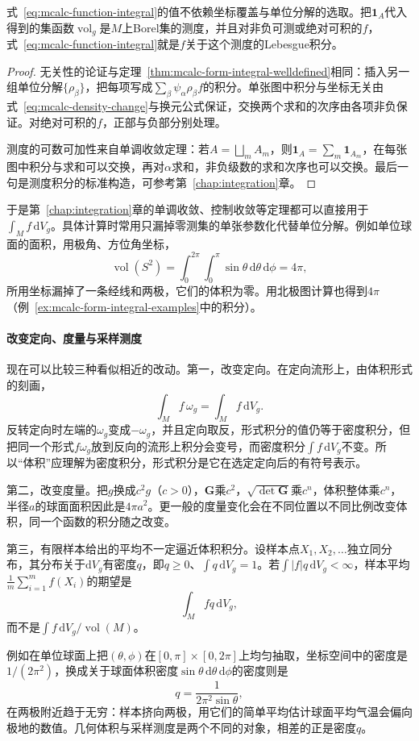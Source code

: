 \begin{theorem}[函数积分的良定性]
\label{thm:mcalc-function-integral-welldefined}
式~\eqref{eq:mcalc-function-integral}的值不依赖坐标覆盖与单位分解的选取。把$\mathbf 1_A$代入得到的集函数$\operatorname{vol}_g$是$M$上Borel集的测度，并且对非负可测或绝对可积的$f$，式~\eqref{eq:mcalc-function-integral}就是$f$关于这个测度的Lebesgue积分。
\end{theorem}

\begin{proof}
无关性的论证与定理~\ref{thm:mcalc-form-integral-welldefined}相同：插入另一组单位分解$\{\rho_\beta\}$，把每项写成$\sum_\beta\psi_\alpha\rho_\beta f$的积分。单张图中积分与坐标无关由式~\eqref{eq:mcalc-density-change}与换元公式保证，交换两个求和的次序由各项非负保证。对绝对可积的$f$，正部与负部分别处理。

测度的可数可加性来自单调收敛定理：若$A=\bigsqcup_mA_m$，则$\mathbf 1_A=\sum_m\mathbf 1_{A_m}$，在每张图中积分与求和可以交换，再对$\alpha$求和，非负级数的求和次序也可以交换。最后一句是测度积分的标准构造，可参考第~\ref{chap:integration}章。
\end{proof}

于是第~\ref{chap:integration}章的单调收敛、控制收敛等定理都可以直接用于$\int_Mf\,\mathrm dV_g$。具体计算时常用只漏掉零测集的单张参数化代替单位分解。例如单位球面的面积，用极角、方位角坐标，
\[
\operatorname{vol}(S^2)=\int_0^{2\pi}\!\!\int_0^\pi\sin\theta\,\mathrm d\theta\,\mathrm d\phi=4\pi ,
\]
所用坐标漏掉了一条经线和两极，它们的体积为零。用北极图计算也得到$4\pi$（例~\ref{ex:mcalc-form-integral-examples}中的积分）。

\paragraph{改变定向、度量与采样测度}
现在可以比较三种看似相近的改动。第一，改变定向。在定向流形上，由体积形式的刻画，
\[
\int_Mf\,\omega_g=\int_Mf\,\mathrm dV_g .
\]
反转定向时左端的$\omega_g$变成$-\omega_g$，并且定向取反，形式积分的值仍等于密度积分，但把同一个形式$f\omega_g$放到反向的流形上积分会变号，而密度积分$\int f\,\mathrm dV_g$不变。所以“体积”应理解为密度积分，形式积分是它在选定定向后的有符号表示。

第二，改变度量。把$g$换成$c^2g$（$c>0$），$\bm G$乘$c^2$，$\sqrt{\det\bm G}$乘$c^n$，体积整体乘$c^n$，半径$a$的球面面积因此是$4\pi a^2$。更一般的度量变化会在不同位置以不同比例改变体积，同一个函数的积分随之改变。

第三，有限样本给出的平均不一定逼近体积积分。设样本点$X_1,X_2,\ldots$独立同分布，其分布关于$\mathrm dV_g$有密度$q$，即$q\geq0$、$\int q\,\mathrm dV_g=1$。若$\int\lvert f\rvert q\,\mathrm dV_g<\infty$，样本平均$\frac1m\sum_{i=1}^mf(X_i)$的期望是
\[
\int_Mfq\,\mathrm dV_g ,
\]
而不是$\int f\,\mathrm dV_g/\operatorname{vol}(M)$。

例如在单位球面上把$(\theta,\phi)$在$[0,\pi]\times[0,2\pi]$上均匀抽取，坐标空间中的密度是$1/(2\pi^2)$，换成关于球面体积密度$\sin\theta\,\mathrm d\theta\,\mathrm d\phi$的密度则是
\[
q=\frac{1}{2\pi^2\sin\theta},
\]
在两极附近趋于无穷：样本挤向两极，用它们的简单平均估计球面平均气温会偏向极地的数值。几何体积与采样测度是两个不同的对象，相差的正是密度$q$。
